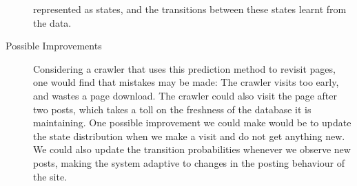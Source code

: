 \documentclass[]{homework}
\begin{document}
\begin{description}
represented as states, and the transitions between these states learnt from the 
data.
	\item[Possible Improvements]
Considering a crawler that uses this prediction method to revisit pages, one 
would find that mistakes may be made: The crawler visits too early, and wastes a 
page download. The crawler could also visit the page after two posts, which 
takes a toll on the freshness of the database it is maintaining. One possible 
improvement we could make would be to update the state distribution when we make 
a visit and do not get anything new. We could also update the transition 
probabilities whenever we observe new posts, making the system adaptive to 
changes in the posting behaviour of the site.

\end{description}


\end{document}
